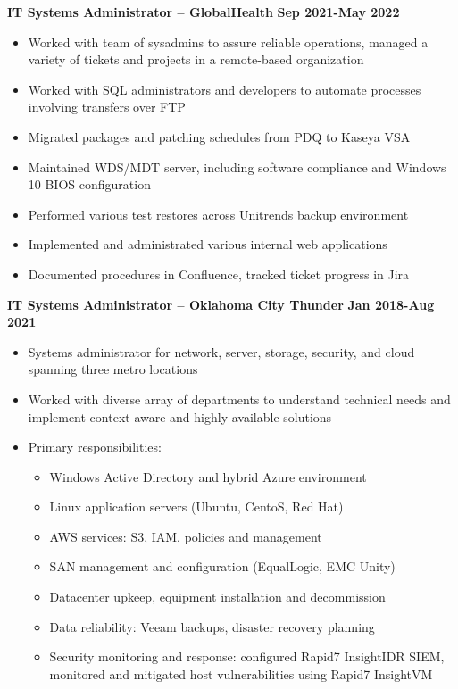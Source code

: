 \documentclass[line]{res}
\begin{document}
\begin{resume}
\textbf{IT Systems Administrator -- GlobalHealth}
\newline
\textbf{Sep 2021-May 2022}
\begin{itemize}
	\item Worked with team of sysadmins to assure reliable operations, managed a variety of tickets and projects in a remote-based organization
	\item Worked with SQL administrators and developers to automate processes involving transfers over FTP
	\item Migrated packages and patching schedules from PDQ to Kaseya VSA
	\item Maintained WDS/MDT server, including software compliance and Windows 10 BIOS configuration
	\item Performed various test restores across Unitrends backup environment
	\item Implemented and administrated various internal web applications
	\item Documented procedures in Confluence, tracked ticket progress in Jira 
\end{itemize}
\textbf{IT Systems Administrator -- Oklahoma City Thunder}
\newline
\textbf{Jan 2018-Aug 2021}
\begin{itemize}
	\item Systems administrator for network, server, storage, security, and cloud spanning three metro locations
	\item Worked with diverse array of departments to understand technical needs and implement context-aware and highly-available solutions
	\item Primary responsibilities:
		\begin{itemize}
			\item Windows Active Directory and hybrid Azure environment
			\item Linux application servers (Ubuntu, CentoS, Red Hat)
			\item AWS services: S3, IAM, policies and management
			\item SAN management and configuration (EqualLogic, EMC Unity)
			\item Datacenter upkeep, equipment installation and decommission
			\item Data reliability: Veeam backups, disaster recovery planning
			\item Security monitoring and response: configured Rapid7 InsightIDR SIEM, monitored and mitigated host vulnerabilities using Rapid7 InsightVM

\end{itemize}
\end{itemize}
\end{resume}
\end{document}
